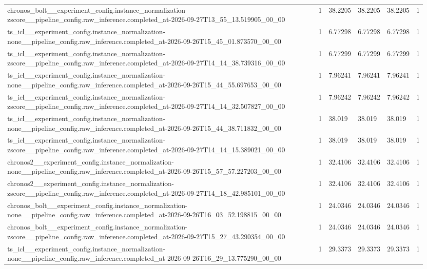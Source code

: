 \begin{tabular}{llllll}
chronos\_bolt\_\_experiment\_config.instance\_normalization-zscore\_\_pipeline\_config.raw\_inference.completed\_at-2026-09-27T13\_55\_13.519905\_00\_00 & 1 & 38.2205 & 38.2205 & 38.2205 & 1 \\
ts\_icl\_\_experiment\_config.instance\_normalization-none\_\_pipeline\_config.raw\_inference.completed\_at-2026-09-26T15\_45\_01.873570\_00\_00 & 1 & 6.77298 & 6.77298 & 6.77298 & 1 \\
ts\_icl\_\_experiment\_config.instance\_normalization-zscore\_\_pipeline\_config.raw\_inference.completed\_at-2026-09-27T14\_14\_38.739316\_00\_00 & 1 & 6.77299 & 6.77299 & 6.77299 & 1 \\
ts\_icl\_\_experiment\_config.instance\_normalization-none\_\_pipeline\_config.raw\_inference.completed\_at-2026-09-26T15\_44\_55.697653\_00\_00 & 1 & 7.96241 & 7.96241 & 7.96241 & 1 \\
ts\_icl\_\_experiment\_config.instance\_normalization-zscore\_\_pipeline\_config.raw\_inference.completed\_at-2026-09-27T14\_14\_32.507827\_00\_00 & 1 & 7.96242 & 7.96242 & 7.96242 & 1 \\
ts\_icl\_\_experiment\_config.instance\_normalization-none\_\_pipeline\_config.raw\_inference.completed\_at-2026-09-26T15\_44\_38.711832\_00\_00 & 1 & 38.019 & 38.019 & 38.019 & 1 \\
ts\_icl\_\_experiment\_config.instance\_normalization-zscore\_\_pipeline\_config.raw\_inference.completed\_at-2026-09-27T14\_14\_15.389021\_00\_00 & 1 & 38.019 & 38.019 & 38.019 & 1 \\
chronos2\_\_experiment\_config.instance\_normalization-none\_\_pipeline\_config.raw\_inference.completed\_at-2026-09-26T15\_57\_57.227203\_00\_00 & 1 & 32.4106 & 32.4106 & 32.4106 & 1 \\
chronos2\_\_experiment\_config.instance\_normalization-zscore\_\_pipeline\_config.raw\_inference.completed\_at-2026-09-27T14\_18\_42.985101\_00\_00 & 1 & 32.4106 & 32.4106 & 32.4106 & 1 \\
chronos\_bolt\_\_experiment\_config.instance\_normalization-none\_\_pipeline\_config.raw\_inference.completed\_at-2026-09-26T16\_03\_52.198815\_00\_00 & 1 & 24.0346 & 24.0346 & 24.0346 & 1 \\
chronos\_bolt\_\_experiment\_config.instance\_normalization-zscore\_\_pipeline\_config.raw\_inference.completed\_at-2026-09-27T15\_27\_43.290354\_00\_00 & 1 & 24.0346 & 24.0346 & 24.0346 & 1 \\
ts\_icl\_\_experiment\_config.instance\_normalization-none\_\_pipeline\_config.raw\_inference.completed\_at-2026-09-26T16\_29\_13.775290\_00\_00 & 1 & 29.3373 & 29.3373 & 29.3373 & 1 \\

\end{tabular}
